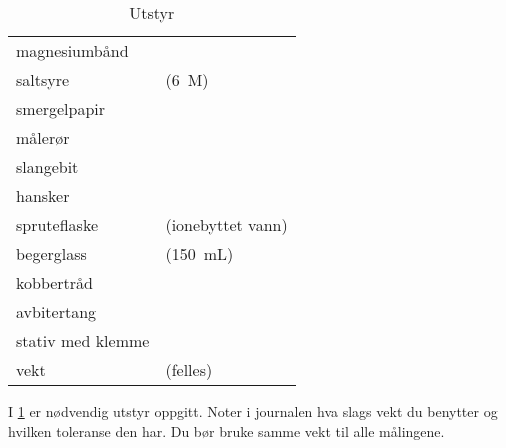	\begin{table}[htpb]
		\caption{Utstyr}
		\label{tbl:equipment}
		\begin{tabular}{ll}
			\toprule
			magnesiumbånd & \\ 
			saltsyre & (\SI{6}{M}) \\
			smergelpapir & \\
			målerør & \\
			slangebit & \\
			hansker & \\
			spruteflaske & (ionebyttet vann) \\
			begerglass & (\SI{150}{mL}) \\
			kobbertråd & \\
			avbitertang & \\ 
			stativ med klemme & \\ 
			vekt & (felles) \\ \bottomrule 
		\end{tabular}
	\end{table}
	
	I \cref{tbl:equipment} er nødvendig utstyr oppgitt.	Noter i journalen hva slags vekt du benytter og hvilken toleranse den har. Du bør bruke samme vekt til alle målingene.
	
